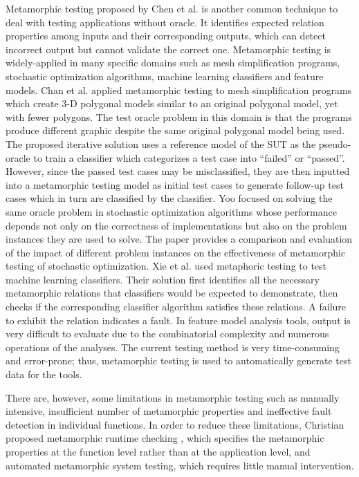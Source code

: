 \documentclass[12pt,\mydriver]{thesis}
\begin{document}
Metamorphic testing \cite{chen1998metamorphic} proposed by Chen et al. is another common technique to deal with testing applications without oracle. It identifies expected relation properties among inputs and their corresponding outputs,
which can detect incorrect output but cannot validate the correct one. Metamorphic testing is widely-applied in many specific domains such as mesh simplification programs, stochastic optimization algorithms, machine learning classifiers and feature models.
Chan et al. applied metamorphic testing to mesh simplification programs which create 3-D polygonal models similar to an original polygonal model, yet with fewer polygons\cite{Chan:2010:FFP:1815297.1815298, chan2009pat}. The test oracle problem in this domain is that the programs produce different graphic despite the same original polygonal model being used. The proposed iterative solution uses a reference model of the SUT as the pseudo-oracle to train a classifier which categorizes a test case into ``failed'' or ``passed''. However, since the passed test cases may be misclassified, they are then inputted into a metamorphic testing model as initial test cases to generate follow-up test cases which in turn are classified by the classifier.
Yoo \cite{Yoo:2010:MTS:1799526.1799581} focused on solving the same oracle problem in stochastic optimization algorithms whose performance depends not only on the correctness of implementations but also on the problem instances they are used to solve. The paper provides a comparison and evaluation of the impact of different problem instances on the effectiveness of metamorphic testing of stochastic optimization.
Xie et al. \cite{Xie:2011:TVM:1942318.1942371} used metaphoric testing to test machine learning classifiers. Their solution first identifies all the necessary metamorphic relations that classifiers would be expected to demonstrate, then checks if the corresponding classifier algorithm satisfies these relations. A failure to exhibit the relation indicates a fault.
In feature model analysis tools, output is very difficult to evaluate due to the combinatorial complexity and numerous operations of the analyses. The current testing method is very time-consuming and error-prone; thus, metamorphic testing is used to automatically generate test data for the tools.

There are, however, some limitations in metamorphic testing such as manually intensive, insufficient number of metamorphic properties and ineffective fault detection in individual functions. In order to reduce these limitations, Christian proposed metamorphic runtime checking \cite{Murphy:2010:MTT:1970820}, which specifies the metamorphic properties at the function level rather than at the application level, and automated metamorphic system testing, \cite{Murphy:2009:AST:1572272.1572295} which requires little manual intervention.
\end{document}
